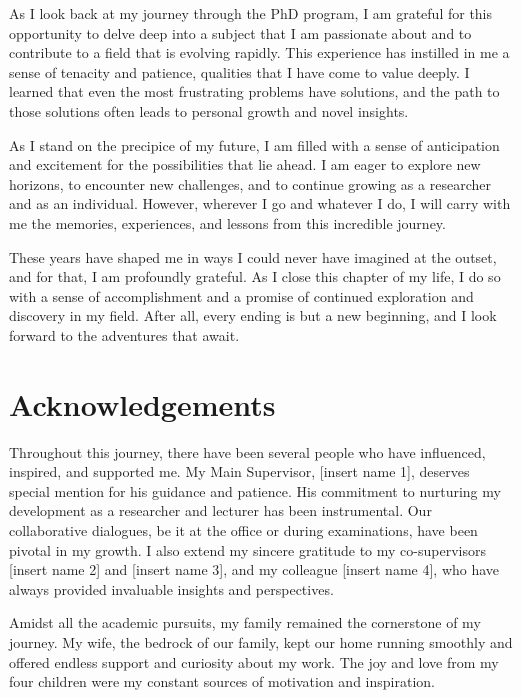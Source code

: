 \documentclass[
  8pt,
  letterpaper,
  DIV=11,
  numbers=noendperiod]{scrartcl}
\begin{document}
As I look back at my journey through the PhD program, I am grateful for
this opportunity to delve deep into a subject that I am passionate about
and to contribute to a field that is evolving rapidly. This experience
has instilled in me a sense of tenacity and patience, qualities that I
have come to value deeply. I learned that even the most frustrating
problems have solutions, and the path to those solutions often leads to
personal growth and novel insights.

As I stand on the precipice of my future, I am filled with a sense of
anticipation and excitement for the possibilities that lie ahead. I am
eager to explore new horizons, to encounter new challenges, and to
continue growing as a researcher and as an individual. However, wherever
I go and whatever I do, I will carry with me the memories, experiences,
and lessons from this incredible journey.

These years have shaped me in ways I could never have imagined at the
outset, and for that, I am profoundly grateful. As I close this chapter
of my life, I do so with a sense of accomplishment and a promise of
continued exploration and discovery in my field. After all, every ending
is but a new beginning, and I look forward to the adventures that await.

\newpage

\hypertarget{acknowledgements}{%
\section{Acknowledgements}\label{acknowledgements}}

Throughout this journey, there have been several people who have
influenced, inspired, and supported me. My Main Supervisor, {[}insert
name 1{]}, deserves special mention for his guidance and patience. His
commitment to nurturing my development as a researcher and lecturer has
been instrumental. Our collaborative dialogues, be it at the office or
during examinations, have been pivotal in my growth. I also extend my
sincere gratitude to my co-supervisors {[}insert name 2{]} and {[}insert
name 3{]}, and my colleague {[}insert name 4{]}, who have always
provided invaluable insights and perspectives.

Amidst all the academic pursuits, my family remained the cornerstone of
my journey. My wife, the bedrock of our family, kept our home running
smoothly and offered endless support and curiosity about my work. The
joy and love from my four children were my constant sources of
motivation and inspiration.
\end{document}

